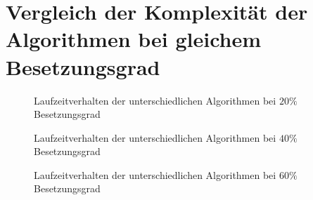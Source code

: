 \documentclass[10pt,DIV=15,a4paper]{scrartcl}
\begin{document}
  \newcommand{\datatablename}{performance.csv}
  \newcommand{\performanceplot}[2]{
    \addplot+ [
      sharp plot,
      discard if not={dichte}{#1}
    ] table[x=groesse,y=#2,col sep=comma] {\datatablename};
  }

  \section{Vergleich der Komplexität der Algorithmen bei gleichem Besetzungsgrad}

  \begin{figure}[h]
  \centering
  \caption{Laufzeitverhalten der unterschiedlichen Algorithmen bei $20\%$ Besetzungsgrad}
  \end{figure}

  \begin{figure}[h]
  \centering
  \caption{Laufzeitverhalten der unterschiedlichen Algorithmen bei $40\%$ Besetzungsgrad}
  \end{figure}

  \begin{figure}[h]
  \centering
  \caption{Laufzeitverhalten der unterschiedlichen Algorithmen bei $60\%$ Besetzungsgrad}
  \end{figure}
\end{document}
